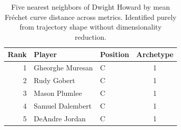 \begin{table}[htbp]
  \centering\small
  \begin{tabular}{rllc}
    \toprule
    Rank & Player & Position & Archetype \\
    \midrule
    1 & Gheorghe Muresan & C & 1 \\
    2 & Rudy Gobert & C & 1 \\
    3 & Mason Plumlee & C & 1 \\
    4 & Samuel Dalembert & C & 1 \\
    5 & DeAndre Jordan & C & 1 \\
    \bottomrule
  \end{tabular}
  \caption{Five nearest neighbors of Dwight Howard by mean Fr\'{e}chet curve distance across metrics. Identified purely from trajectory shape without dimensionality reduction.}
  \label{tab:Dwight_Howard_frechet_curve_neighbors}
\end{table}

